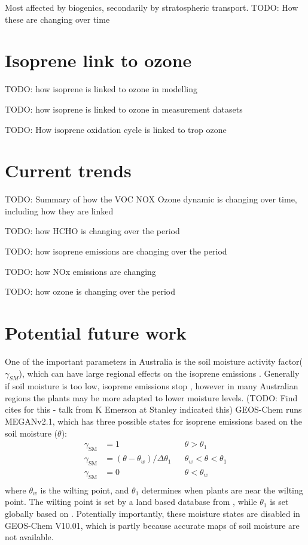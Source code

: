   Most affected by biogenics, secondarily by stratospheric transport.
  TODO: How these are changing over time

\section{Isoprene link to ozone}
\label{Conclusions:isoprene}

  TODO: how isoprene is linked to ozone in modelling

  TODO: how isoprene is linked to ozone in measurement datasets
  
  TODO: How isoprene oxidation cycle is linked to trop ozone
  
\section{Current trends}
\label{Conclusions:trends}

  TODO: Summary of how the VOC NOX Ozone dynamic is changing over time, including how they are linked
  
  TODO: how HCHO is changing over the period

  TODO: how isoprene emissions are changing over the period
  
  TODO: how NOx emissions are changing
  
  TODO: how ozone is changing over the period
  
\section{Potential future work}
\label{Conclusions:future}
  
  One of the important parameters in Australia is the soil moisture activity factor($\gamma_{SM}$), which can have large regional effects on the isoprene emissions \parencite{Sindelarova2014,Bauwens2016}.
  Generally if soil moisture is too low, isoprene emissions stop \parencite{Pegoraro2004,Niinemets2010}, however in many Australian regions the plants may be more adapted to lower moisture levels. (TODO: Find cites for this - talk from K Emerson at Stanley indicated this)
  GEOS-Chem runs MEGANv2.1, which has three possible states for isoprene emissions based on the soil moisture ($\theta$):
  \begin{align*}
  \gamma_\mathrm{SM} & = 1 && \theta > \theta_1 \\
  \gamma_\mathrm{SM} & = (\theta-\theta_w)/\Delta\theta_1  && \theta_w < \theta < \theta_1 \\
  \gamma_\mathrm{SM} & = 0 && \theta < \theta_w \\
  \end{align*}
  where $\theta_w$ is the wilting point, and $\theta_1$ determines when plants are near the wilting point.
  The wilting point is set by a land based database from \textcite{Chen2001}, while $\theta_1$ is set globally based on \textcite{Pegoraro2004}.
  Potentially importantly, these moisture states are disabled in GEOS-Chem V10.01, which is partly because accurate maps of soil moisture are not available.
  
